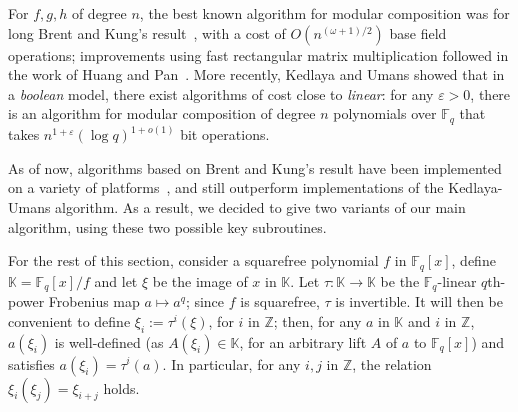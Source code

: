 \documentclass[12pt]{article}
\theoremstyle{plain}
\theoremstyle{definition}
\def\Z{\ensuremath{\mathbb{Z}}}
\def\F{\ensuremath{\mathbb{F}}}
\def\K{\ensuremath{\mathbb{K}}}
\begin{document}
For $f,g,h$ of degree $n$, the best known algorithm for modular
composition was for long Brent and Kung's result~\cite{BrKu78}, with a
cost of $O(n^{(\omega+1)/2})$ base field operations; improvements
using fast rectangular matrix multiplication followed in the work of
Huang and Pan~\cite{HuPa98}. More recently, Kedlaya and Umans showed
that in a {\em boolean} model, there exist algorithms of cost close to
{\em linear}: for any $\varepsilon > 0$, there is an algorithm for
modular composition of degree $n$ polynomials over $\F_q$ that takes
$n^{1+\varepsilon} (\log q)^{1+o(1)}$ bit operations.

As of now, algorithms based on Brent and Kung's result have been
implemented on a variety of platforms~\cite{shoup2001ntl,BoCaPl97,Hart10},
and still outperform implementations of the Kedlaya-Umans algorithm. As
a result, we decided to give two variants of our main algorithm, using
these two possible key subroutines.

For the rest of this section, consider a squarefree polynomial $f$ in
$\F_q[x]$, define $\K=\F_q[x]/f$ and let $\xi$ be the image of $x$ in
$\K$.  Let $\tau: \K \to \K$ be the $\F_q$-linear $q$th-power
Frobenius map $a \mapsto a^q$; since $f$ is squarefree, $\tau$ is
invertible. It will then be convenient to define $\xi_i:=\tau^i(\xi)$,
for $i$ in $\Z$; then, for any $a$ in $\K$ and $i$ in $\Z$, $a(\xi_i)$
is well-defined (as $A(\xi_i) \in \K$, for an arbitrary lift $A$ of $a$ to
$\F_q[x]$) and satisfies $a(\xi_i)=\tau^i(a)$.  In particular, for any
$i,j$ in $\Z$, the relation $\xi_i(\xi_j)=\xi_{i+j}$ holds.
\end{document}
